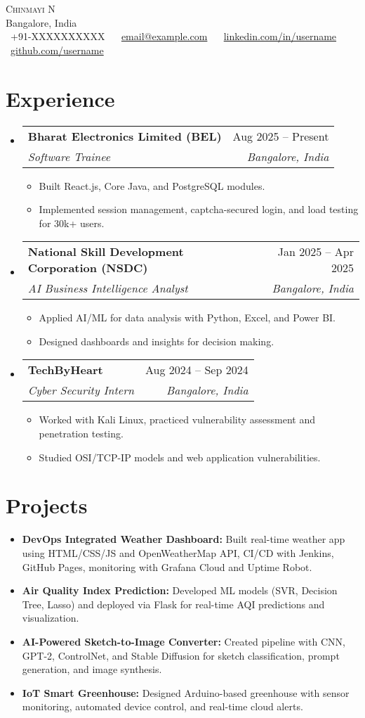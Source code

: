 \documentclass[a4paper,10pt]{article}
\makeatletter
\newcommand{\resumeItem}[1]{\item\small{#1}}
\newcommand{\resumeSubheading}[4]{
  \vspace{-1pt}\item
    \begin{tabular*}{0.97\textwidth}{l@{\extracolsep{\fill}}r}
      \textbf{#1} & #2 \\
      \textit{#3} & \textit{#4} \\
    \end{tabular*}\vspace{-5pt}
}
\newcommand{\resumeSubHeadingListStart}{\begin{itemize}[leftmargin=*]}
\newcommand{\resumeSubHeadingListEnd}{\end{itemize}}
\newcommand{\resumeItemListStart}{\begin{itemize}[label=\raisebox{0.25ex}{\tiny$\bullet$}]}
\newcommand{\resumeItemListEnd}{\end{itemize}\vspace{-5pt}}
\makeatother
\begin{document}
\begin{center}
    {\Huge \scshape Chinmayi N} \\ \vspace{2pt}
    Bangalore, India \\ \vspace{2pt}
    \scriptsize
    \faPhone\ +91-XXXXXXXXXX ~
    \faEnvelope\ \href{mailto:email@example.com}{email@example.com} ~
    \faLinkedin\ \href{https://linkedin.com/in/username}{linkedin.com/in/username} ~
    \faGithub\ \href{https://github.com/username}{github.com/username}
    \vspace{-8pt}
\end{center}


\section{Experience}
  \resumeSubHeadingListStart
    \resumeSubheading
      {Bharat Electronics Limited (BEL)}{Aug 2025 -- Present}
      {Software Trainee}{Bangalore, India}
      \resumeItemListStart
        \resumeItem{Built React.js, Core Java, and PostgreSQL modules.}
        \resumeItem{Implemented session management, captcha-secured login, and load testing for 30k+ users.}
      \resumeItemListEnd

    \resumeSubheading
      {National Skill Development Corporation (NSDC)}{Jan 2025 -- Apr 2025}
      {AI Business Intelligence Analyst}{Bangalore, India}
      \resumeItemListStart
        \resumeItem{Applied AI/ML for data analysis with Python, Excel, and Power BI.}
        \resumeItem{Designed dashboards and insights for decision making.}
      \resumeItemListEnd

    \resumeSubheading
      {TechByHeart}{Aug 2024 -- Sep 2024}
      {Cyber Security Intern}{Bangalore, India}
      \resumeItemListStart
        \resumeItem{Worked with Kali Linux, practiced vulnerability assessment and penetration testing.}
        \resumeItem{Studied OSI/TCP-IP models and web application vulnerabilities.}
      \resumeItemListEnd
  \resumeSubHeadingListEnd

\section{Projects}
  \resumeSubHeadingListStart
    \resumeItem{\textbf{DevOps Integrated Weather Dashboard:} Built real-time weather app using HTML/CSS/JS and OpenWeatherMap API, CI/CD with Jenkins, GitHub Pages, monitoring with Grafana Cloud and Uptime Robot.}
    \resumeItem{\textbf{Air Quality Index Prediction:} Developed ML models (SVR, Decision Tree, Lasso) and deployed via Flask for real-time AQI predictions and visualization.}
    \resumeItem{\textbf{AI-Powered Sketch-to-Image Converter:} Created pipeline with CNN, GPT-2, ControlNet, and Stable Diffusion for sketch classification, prompt generation, and image synthesis.}
    \resumeItem{\textbf{IoT Smart Greenhouse:} Designed Arduino-based greenhouse with sensor monitoring, automated device control, and real-time cloud alerts.}
  \resumeSubHeadingListEnd
\end{document}

